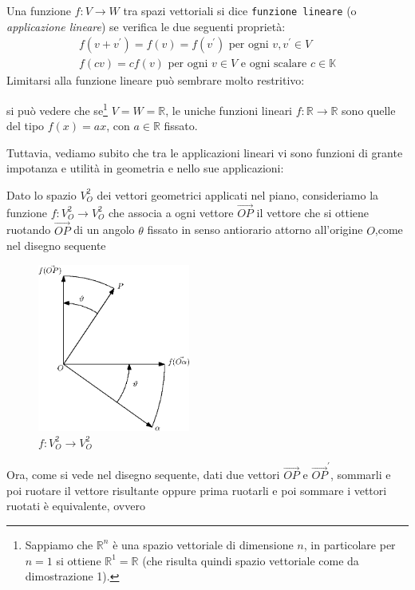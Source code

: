 \begin{definizione}
  Una funzione $f:V\to W$ tra spazi vettoriali si dice \texttt{funzione lineare} (o \textit{applicazione
    lineare}) se verifica le due seguenti proprietà:
  \begin{eqnarray}
    \label{4.1-4.2}
    f(v+v^{\prime})=f(v)=f(v^\prime) \text{ per ogni } v,v^\prime \in V\\
    f(cv)=cf(v) \text{ per ogni } v\in V\text{ e ogni scalare }c \in \mathds{K}
  \end{eqnarray}
  Limitarsi alla funzione lineare può sembrare molto restritivo:
  \begin{esempio}
    si può vedere che se\footnote{Sappiamo che $\mathds{R}^n$ è una spazio vettoriale di dimensione $n$, in
      particolare per $n=1$ si ottiene $\mathds{R}^1=\mathds{R}$ (che risulta quindi spazio vettoriale come da
      dimostrazione 1).}  $V=W=\mathds{R}$, le uniche funzioni lineari $f:\mathds{R}\to\mathds{R}$ sono quelle
    del tipo $f(x)=ax$, con $a\in \mathds{R}$ fissato.
  \end{esempio}
  Tuttavia, vediamo subito che tra le applicazioni lineari vi sono funzioni di grante impotanza e utilità in
  geometria e nello sue applicazioni:
  \begin{esempio}
    Dato lo spazio $V_O^2$ dei vettori geometrici applicati nel piano, consideriamo la funzione
    $f:V_O^2\to V_O^2$ che associa a ogni vettore $\vec{OP}$ il vettore che si ottiene ruotando $\vec{OP}$ di
    un angolo $\theta$ fissato in senso antiorario attorno all'origine $O$,come nel disegno sequente 
    \begin{figure}[th]
      \centering
        \includegraphics[width=5cm]{img/finiti/imgex4-2-1.eps}
      \caption{$f:V_O^2\to V_O^2$}
    \end{figure}
    Ora, come si vede nel disegno sequente, dati due vettori $\vec{OP}$ e $\vec{OP}^\prime$, sommarli e poi
    ruotare il vettore risultante oppure prima ruotarli e poi sommare i vettori ruotati è equivalente, ovvero

\end{esempio}
\end{definizione}
